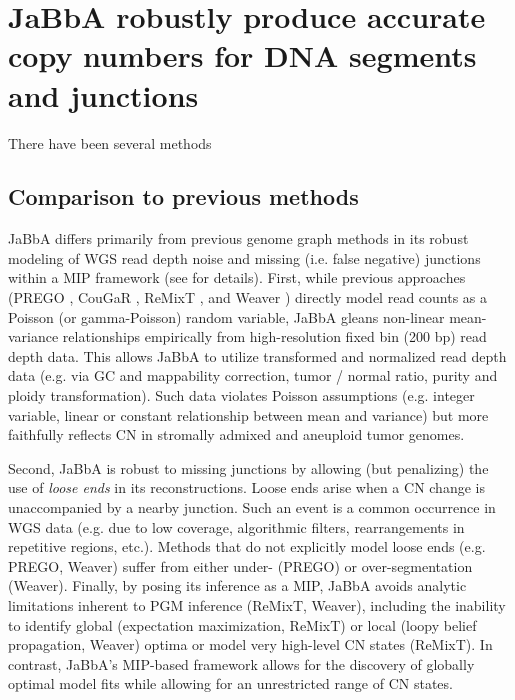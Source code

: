 \documentclass[phd,tocprelim]{cornell}
\begin{document}
\section{JaBbA robustly produce accurate copy numbers for DNA segments and junctions}
There have been several methods 

\subsection*{Comparison to previous methods}
JaBbA differs primarily from previous genome graph methods in its robust modeling of WGS read depth noise and missing (i.e. false negative) junctions within a MIP framework (see  for details). First, while previous approaches (PREGO \cite{Oesper2012-vw}, CouGaR \cite{Medvedev:2010bm}, ReMixT \cite{McPherson2017-ry}, and Weaver \cite{Li2016-qa}) directly model read counts as a Poisson (or gamma-Poisson) random variable, JaBbA gleans non-linear mean-variance relationships empirically from high-resolution fixed bin (200 bp) read depth data.  This allows JaBbA to utilize transformed and normalized read depth data (e.g. via GC and mappability correction, tumor / normal ratio, purity and ploidy transformation).  Such data violates Poisson assumptions (e.g. integer variable, linear or constant relationship between mean and variance) but more faithfully reflects CN in stromally admixed and aneuploid tumor genomes.

Second, JaBbA is robust to missing junctions by allowing (but penalizing) the use of \textit{loose ends} in its reconstructions.  Loose ends arise when a CN change is unaccompanied by a nearby junction. Such an event is a common occurrence in WGS data (e.g. due to low coverage, algorithmic filters, rearrangements in repetitive regions, etc.). Methods that do not explicitly model loose ends (e.g. PREGO, Weaver) suffer from either under- (PREGO) or over-segmentation (Weaver). Finally, by posing its inference as a MIP, JaBbA avoids analytic limitations inherent to PGM inference (ReMixT, Weaver), including the inability to identify global (expectation maximization, ReMixT) or local (loopy belief propagation, Weaver) optima or model very high-level CN states (ReMixT).  In contrast, JaBbA's MIP-based framework allows for the discovery of globally optimal model fits while allowing for an unrestricted range of CN states.
\end{document}
